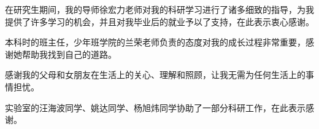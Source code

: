 
\begin{acknowledgements}

在研究生期间，我的导师徐宏力老师对我的科研学习进行了诸多细致的指导，为我提供了许多学习的机会，并且对我毕业后的就业予以了支持，在此表示衷心感谢。

本科时的班主任，少年班学院的兰荣老师负责的态度对我的成长过程非常重要，感谢她帮助我找到自己的道路。

感谢我的父母和女朋友在生活上的关心、理解和照顾，让我无需为任何生活上的事情担忧。

实验室的汪海波同学、姚达同学、杨旭炜同学协助了一部分科研工作，在此表示感谢。

\end{acknowledgements}
